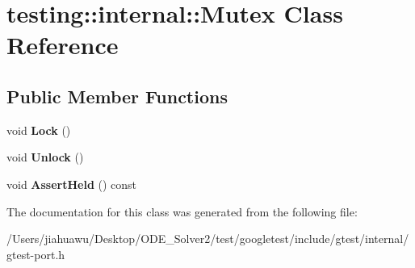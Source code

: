\hypertarget{classtesting_1_1internal_1_1_mutex}{}\section{testing\+:\+:internal\+:\+:Mutex Class Reference}
\label{classtesting_1_1internal_1_1_mutex}
\subsection*{Public Member Functions}
\begin{DoxyCompactItemize}
\item 
\mbox{\label{classtesting_1_1internal_1_1_mutex_ae7e2191886c00182176b23c4f4d049f8}} 
void {\bfseries Lock} ()
\item 
\mbox{\label{classtesting_1_1internal_1_1_mutex_a315188055de1be98884519ad84eff2e6}} 
void {\bfseries Unlock} ()
\item 
\mbox{\label{classtesting_1_1internal_1_1_mutex_af45bf1660ac4110338a02a8680b2f486}} 
void {\bfseries Assert\+Held} () const
\end{DoxyCompactItemize}


The documentation for this class was generated from the following file\+:\begin{DoxyCompactItemize}
\item 
/\+Users/jiahuawu/\+Desktop/\+O\+D\+E\+\_\+\+Solver2/test/googletest/include/gtest/internal/gtest-\/port.\+h\end{DoxyCompactItemize}
